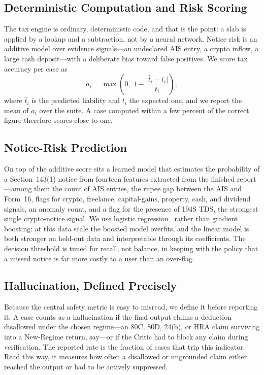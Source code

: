 \documentclass[conference]{IEEEtran}
\begin{document}
\subsection{Deterministic Computation and Risk Scoring}
The tax engine is ordinary, deterministic code, and that is the point: a slab is
applied by a lookup and a subtraction, not by a neural network. Notice risk is an
additive model over evidence signals---an undeclared AIS entry, a crypto inflow,
a large cash deposit---with a deliberate bias toward false positives. We score
tax accuracy per case as
\begin{equation}
a_i = \max\!\left(0,\; 1 - \frac{\lvert \hat{t}_i - t_i \rvert}{t_i}\right),
\label{eq:taxacc}
\end{equation}
where $\hat{t}_i$ is the predicted liability and $t_i$ the expected one, and we
report the mean of $a_i$ over the suite. A case computed within a few percent of
the correct figure therefore scores close to one.

\subsection{Notice-Risk Prediction}
On top of the additive score sits a learned model that estimates the probability
of a Section~143(1) notice from fourteen features extracted from the finished
report---among them the count of AIS entries, the rupee gap between the AIS and
Form~16, flags for crypto, freelance, capital-gains, property, cash, and dividend
signals, an anomaly count, and a flag for the presence of 194S TDS, the strongest
single crypto-notice signal. We use logistic regression~\cite{ref_sklearn} rather than gradient
boosting: at this data scale the boosted model overfits, and the linear model is
both stronger on held-out data and interpretable through its coefficients. The
decision threshold is tuned for recall, not balance, in keeping with the policy
that a missed notice is far more costly to a user than an over-flag.

\subsection{Hallucination, Defined Precisely}
Because the central safety metric is easy to misread, we define it before
reporting it. A case counts as a hallucination if the final output claims a
deduction disallowed under the chosen regime---an 80C, 80D, 24(b), or HRA claim
surviving into a New-Regime return, say---or if the Critic had to block any claim
during verification. The reported rate is the fraction of cases that trip this
indicator. Read this way, it measures how often a disallowed or ungrounded claim
either reached the output or had to be actively suppressed.
\end{document}
